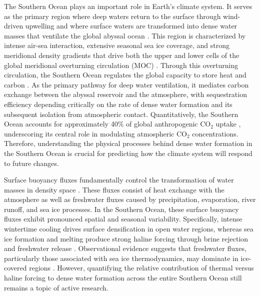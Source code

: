 \documentclass[draft]{agujournal2025}
\begin{document}
The Southern Ocean plays an important role in Earth's climate system. It serves as the primary region where deep waters return to the surface through wind-driven upwelling and where surface waters are transformed into dense water masses that ventilate the global abyssal ocean \citep{Marshall2012,Talley2013}. This region is characterized by intense air-sea interaction, extensive seasonal sea ice coverage, and strong meridional density gradients that drive both the upper and lower cells of the global meridional overturning circulation (MOC) \citep{Speer2000,Lumpkin2007}. Through this overturning circulation, the Southern Ocean regulates the global capacity to store heat and carbon \citep{Marinov2006,Gray2024}.  As the primary pathway for deep water ventilation, it mediates carbon exchange between the abyssal reservoir and the atmosphere, with sequestration efficiency depending critically on the rate of dense water formation and its subsequent isolation from atmospheric contact. Quantitatively, the Southern Ocean accounts for approximately 40\% of global anthropogenic CO${_2}$ uptake \citep{Gray2024}, underscoring its central role in modulating atmospheric CO${_2}$ concentrations. Therefore, understanding the physical processes behind dense water formation in the Southern Ocean is crucial for predicting how the climate system will respond to future changes.


Surface buoyancy fluxes fundamentally control the transformation of water masses in density space \citep{Walin1982,Speer1992,drake2025water}. These fluxes consist of heat exchange with the atmosphere as well as freshwater fluxes caused by precipitation, evaporation, river runoff, and sea ice processes. In the Southern Ocean, these surface buoyancy fluxes exhibit pronounced spatial and seasonal variability. Specifically, intense wintertime cooling drives surface densification in open water regions, whereas sea ice formation and melting produce strong haline forcing through brine rejection and freshwater release \citep{Abernathey2016,Pellichero2018}. Observational evidence suggests that freshwater fluxes, particularly those associated with sea ice thermodynamics, may dominate in ice-covered regions \citep{Pellichero2018,Bailey2023}. However, quantifying the relative contribution of thermal versus haline forcing to dense water formation across the entire Southern Ocean still remains a topic of active research.

\end{document}
